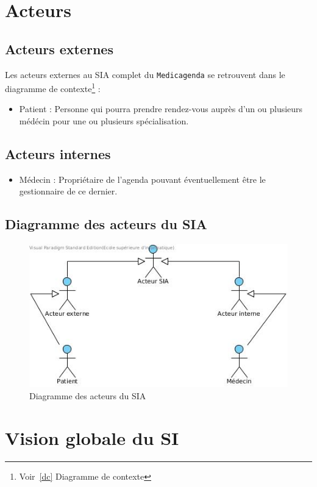 \documentclass[a4paper, 11pt]{report}
\begin{document}
\section{Acteurs}
\subsection{Acteurs externes}
Les acteurs externes au SIA complet du \texttt{Medicagenda} se retrouvent dans le 
diagramme de contexte\footnote{Voir~\ref{dc} Diagramme de contexte} : 
\begin{itemize}
	\item Patient : Personne qui pourra prendre rendez-vous auprès d'un ou
		plusieurs médécin pour une ou plusieurs spécialisation.
\end{itemize}
\subsection{Acteurs internes}
\begin{itemize}
	\item Médecin : Propriétaire de l'agenda pouvant éventuellement être le
		gestionnaire de ce dernier.
\end{itemize}
\subsection{Diagramme des acteurs du SIA}
\begin{figure}[hb]
	\centering
	\includegraphics[scale=0.7]{acteurs.jpg}
	\caption{Diagramme des acteurs du SIA}
	\label{fig:acteurs}
\end{figure}
\newpage
\section{Vision globale du SI}
\end{document}
